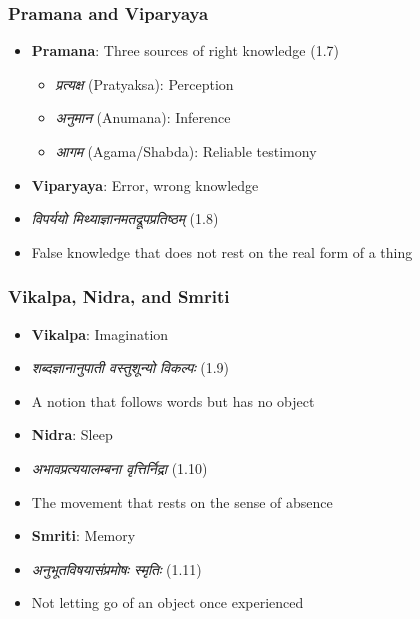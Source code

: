 \begin{frame}[fragile]\frametitle{Pramana and Viparyaya}
    \begin{itemize}
        \item \textbf{Pramana}: Three sources of right knowledge (1.7)
        \begin{itemize}
            \item \textit{प्रत्यक्ष} (Pratyaksa): Perception
            \item \textit{अनुमान} (Anumana): Inference
            \item \textit{आगम} (Agama/Shabda): Reliable testimony
        \end{itemize}
        \item \textbf{Viparyaya}: Error, wrong knowledge
        \item \textit{विपर्ययो मिथ्याज्ञानमतद्रूपप्रतिष्ठम्} (1.8)
        \item False knowledge that does not rest on the real form of a thing
    \end{itemize}
\end{frame}

\begin{frame}[fragile]\frametitle{Vikalpa, Nidra, and Smriti}
    \begin{itemize}
        \item \textbf{Vikalpa}: Imagination
        \item \textit{शब्दज्ञानानुपाती वस्तुशून्यो विकल्पः} (1.9)
        \item A notion that follows words but has no object
        \item \textbf{Nidra}: Sleep
        \item \textit{अभावप्रत्ययालम्बना वृत्तिर्निद्रा} (1.10)
        \item The movement that rests on the sense of absence
        \item \textbf{Smriti}: Memory
        \item \textit{अनुभूतविषयासंप्रमोषः स्मृतिः} (1.11)
        \item Not letting go of an object once experienced
    \end{itemize}
\end{frame}


